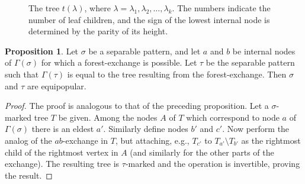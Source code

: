 \documentclass[10pt]{article}
\theoremstyle{definition}
\newtheorem{proposition}{Proposition}
\numberwithin{equation}{section}
\numberwithin{figure}{section}
\begin{document}
\begin{figure}
\begin{center}
			\end{center}
			\caption{The tree $t(\lambda)$, where $\lambda = \lambda_1, \lambda_2, \dots, \lambda_k$. The numbers indicate the number of leaf children, and the sign of the lowest internal node is determined by the parity of its height.}
			\label{fig:talltree}
		\endminipage
	\end{figure}
	

\begin{proposition}\label{prop:abexchange}
Let $\sigma$ be a separable pattern, and let $a$ and $b$ be internal nodes of $\Gamma(\sigma)$ for which a forest-exchange is possible. Let $\tau$ be the separable pattern such that $\Gamma(\tau)$ is equal to the tree resulting from the forest-exchange. Then $\sigma$ and $\tau$ are equipopular.
\end{proposition}
  
\begin{proof}
The proof is analogous to that of the preceding proposition. Let a $\sigma$-marked tree $T$ be given. Among the nodes $A$ of $T$ which correspond to node $a$ of $\Gamma(\sigma)$ there is an eldest $a'$. Similarly define nodes $b'$ and $c'$. Now perform the analog of the $ab$-exchange in $T$, but attaching, e.g., $T_{c'}$ to $T_{a'} \setminus T_{b'}$ as the rightmost child of the rightmost vertex in $A$ (and similarly for the other parts of the exchange). The resulting tree is  $\tau$-marked and the operation is invertible, proving the result.
\end{proof}
\end{document}
